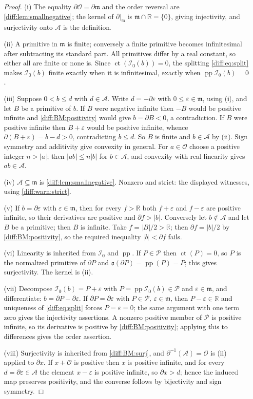 \documentclass[11pt,letterpaper]{article}
\numberwithin{equation}{section}
\theoremstyle{definition}
\theoremstyle{remark}
\newcommand{\R}{\mathbb R}
\newcommand{\der}{\partial}
\newcommand{\Ofin}{\mathcal O}
\newcommand{\mm}{\mathfrak m}
\newcommand{\Pcl}{\mathcal P}
\newcommand{\Acl}{\mathcal A}
\newcommand{\Izero}{\mathcal I_{0}}
\newcommand{\Obs}{\mathfrak o}
\newcommand{\pp}{\operatorname{pp}}
\newcommand{\ct}{\operatorname{ct}}
\newcommand{\abs}[1]{\lvert#1\rvert}
\begin{document}
\begin{proof}
(i) The equality $\der\Ofin=\der\mm$ and the order reversal are
\cref{diff:lem:smallnegative}; the kernel of $\der|_{\mm}$ is
$\mm\cap\R=\{0\}$, giving injectivity, and surjectivity onto $\Acl$ is the
definition.

(ii) A primitive in $\mm$ is finite; conversely a finite primitive becomes
infinitesimal after subtracting its standard part. All primitives differ by a
real constant, so either all are finite or none is. Since $\ct(\Izero(b))=0$,
the splitting \cref{diff:eq:split} makes $\Izero(b)$ finite exactly when it is
infinitesimal, exactly when $\pp\Izero(b)=0$.

(iii) Suppose $0<b\leq d$ with $d\in\Acl$. Write $d=-\der\varepsilon$ with
$0\leq\varepsilon\in\mm$, using (i), and let $B$ be a primitive of $b$. If $B$
were negative infinite then $-B$ would be positive infinite and
\ref{diff:BM:positivity} would give $b=\der B<0$, a contradiction. If $B$ were
positive infinite then $B+\varepsilon$ would be positive infinite, whence
$\der(B+\varepsilon)=b-d>0$, contradicting $b\leq d$. So $B$ is finite and
$b\in\Acl$ by (ii). Sign symmetry and additivity give convexity in general.
For $a\in\Ofin$ choose a positive integer $n>\abs a$; then $\abs{ab}\leq n\abs b$
for $b\in\Acl$, and convexity with real linearity gives $ab\in\Acl$.

(iv) $\Acl\subseteq\mm$ is \cref{diff:lem:smallnegative}. Nonzero and strict:
the displayed witnesses, using \cref{diff:warn:strict}.

(v) If $b=\der\varepsilon$ with $\varepsilon\in\mm$, then for every $f>\R$ both
$f+\varepsilon$ and $f-\varepsilon$ are positive infinite, so their derivatives
are positive and $\der f>\abs b$. Conversely let $b\notin\Acl$ and let $B$ be a
primitive; then $B$ is infinite. Take $f=\abs B/2>\R$; then
$\der f=\abs b/2$ by \ref{diff:BM:positivity}, so the required inequality
$\abs b<\der f$ fails.

(vi) Linearity is inherited from $\Izero$ and $\pp$. If $P\in\Pcl$ then
$\ct(P)=0$, so $P$ is the normalized primitive of $\der P$ and
$\Obs(\der P)=\pp(P)=P$; this gives surjectivity. The kernel is (ii).

(vii) Decompose $\Izero(b)=P+\varepsilon$ with $P=\pp\Izero(b)\in\Pcl$ and
$\varepsilon\in\mm$, and differentiate: $b=\der P+\der\varepsilon$. If
$\der P=\der\varepsilon$ with $P\in\Pcl$, $\varepsilon\in\mm$, then
$P-\varepsilon\in\R$ and uniqueness of \cref{diff:eq:split} forces
$P=\varepsilon=0$; the same argument with one term zero gives the injectivity
assertions. A nonzero positive member of $\Pcl$ is positive infinite, so its
derivative is positive by \ref{diff:BM:positivity}; applying this to
differences gives the order assertion.

(viii) Surjectivity is inherited from \ref{diff:BM:surj}, and
$\der^{-1}(\Acl)=\Ofin$ is (ii) applied to $\der x$. If $x+\Ofin$ is positive
then $x$ is positive infinite, and for every $d=\der\varepsilon\in\Acl$ the
element $x-\varepsilon$ is positive infinite, so $\der x>d$; hence the induced
map preserves positivity, and the converse follows by bijectivity and sign
symmetry.
\end{proof}
\end{document}
